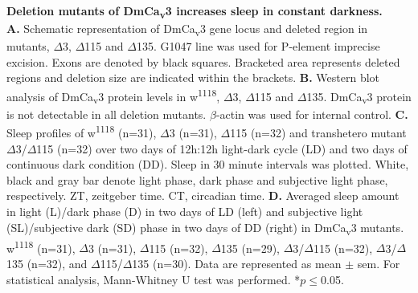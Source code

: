 \label{fig:S3}
\textbf{Deletion mutants of DmCa\textsubscript{v}3 increases sleep in constant darkness.}
\\
\textbf{A.} Schematic representation of DmCa\textsubscript{v}3 gene locus and deleted region in mutants, $\Delta$3, $\Delta$115 and $\Delta$135.
G1047 line was used for P-element imprecise excision.
Exons are denoted by black squares.
Bracketed area represents deleted regions and deletion size are indicated within the brackets.
\textbf{B.} Western blot analysis of DmCa\textsubscript{v}3 protein levels in w\textsuperscript{1118}, $\Delta$3, $\Delta$115 and $\Delta$135.
DmCa\textsubscript{v}3 protein is not detectable in all deletion mutants.
$\beta$-actin was used for internal control.
\textbf{C.} Sleep profiles of w\textsuperscript{1118} (n=31), $\Delta$3 (n=31), $\Delta$115 (n=32) and transhetero mutant $\Delta$3/$\Delta$115 (n=32) over two days of 12h:12h light-dark cycle (LD) and two days of continuous dark condition (DD).
Sleep in 30 minute intervals was plotted.
White, black and gray bar denote light phase, dark phase and subjective light phase, respectively.
ZT, zeitgeber time.
CT, circadian time.
\textbf{D.} Averaged sleep amount in light (L)/dark phase (D) in two days of LD (left) and subjective light (SL)/subjective dark (SD) phase in two days of DD (right) in DmCa\textsubscript{v}3 mutants.
w\textsuperscript{1118} (n=31), $\Delta$3 (n=31), $\Delta$115 (n=32), $\Delta$135 (n=29), $\Delta$3/$\Delta$115 (n=32), $\Delta$3/$\Delta$135 (n=32), and $\Delta$115/$\Delta$135 (n=30).
Data are represented as mean $\pm$ sem.
For statistical analysis, Mann-Whitney U test was performed.
*$p\le$0.05.